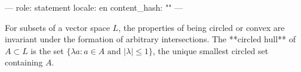 ---
role: statement
locale: en
content_hash: ""
---

For subsets of a vector space $L$, the properties of being circled or convex are invariant under the formation of arbitrary intersections. The **circled hull** of $A \subset L$ is the set $\{\lambda a : a \in A \text{ and } |\lambda| \leq 1\}$, the unique smallest circled set containing $A$.
